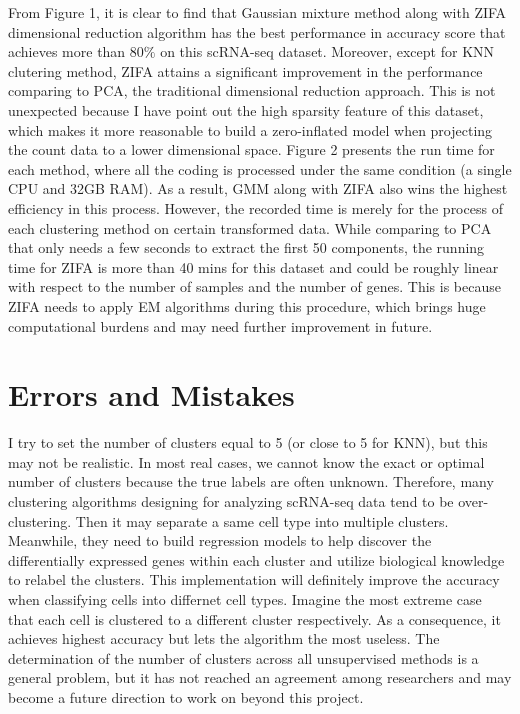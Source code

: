 \documentclass[12pt]{article}
\theoremstyle{definition}
\begin{document}
From Figure 1, it is clear to find that Gaussian mixture method along with ZIFA dimensional reduction algorithm has the best performance in accuracy score that achieves more than $80\%$ on this scRNA-seq dataset. Moreover, except for KNN clutering method, ZIFA attains a significant improvement in the performance comparing to PCA, the traditional dimensional reduction approach. This is not unexpected because I have point out the high sparsity feature of this dataset, which makes it more reasonable to build a zero-inflated model when projecting the count data to a lower dimensional space. Figure 2 presents the run time for each method, where all the coding is processed under the same condition (a single CPU and 32GB RAM). As a result, GMM along with ZIFA also wins the highest efficiency in this process. However, the recorded time is merely for the process of each clustering method on certain transformed data. While comparing to PCA that only needs a few seconds to extract the first 50 components, the running time for ZIFA is more than 40 mins for this dataset and could be roughly linear with respect to the number of samples and the number of genes. This is because ZIFA needs to apply EM algorithms during this procedure, which brings huge computational burdens and may need further improvement in future.

\section{Errors and Mistakes}

I try to set the number of clusters equal to 5 (or close to 5 for KNN), but this may not be realistic. In most real cases, we cannot know the exact or optimal number of clusters because the true labels are often unknown. Therefore, many clustering algorithms designing for analyzing scRNA-seq data tend to be over-clustering. Then it may separate a same cell type into multiple clusters. Meanwhile, they need to build regression models to help discover the differentially expressed genes within each cluster and utilize biological knowledge to relabel the clusters. This implementation will definitely improve the accuracy when classifying cells into differnet cell types. Imagine the most extreme case that each cell is clustered to a different cluster respectively. As a consequence, it achieves highest accuracy but lets the algorithm the most useless. The determination of the number of clusters across all unsupervised methods is a general problem, but it has not reached an agreement among researchers and may become a future direction to work on beyond this project.
\end{document}
